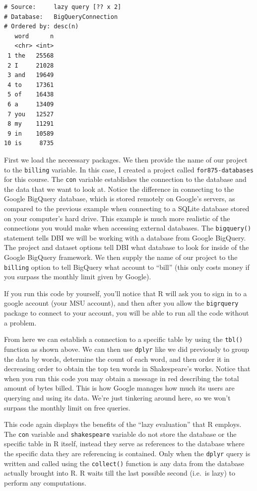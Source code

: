 \documentclass[
]{krantz}
\begin{document}
\begin{verbatim}
# Source:     lazy query [?? x 2]
# Database:   BigQueryConnection
# Ordered by: desc(n)
   word      n
   <chr> <int>
 1 the   25568
 2 I     21028
 3 and   19649
 4 to    17361
 5 of    16438
 6 a     13409
 7 you   12527
 8 my    11291
 9 in    10589
10 is     8735
\end{verbatim}

First we load the neceessary packages. We then provide the name of our project to the \texttt{billing} variable. In this case, I created a project called \texttt{for875-databases} for this course. The \texttt{con} variable establishes the connection to the database and the data that we want to look at. Notice the difference in connecting to the Google BigQuery database, which is stored remotely on Google's servers, as compared to the previous example when connecting to a SQLite database stored on your computer's hard drive. This example is much more realistic of the connections you would make when accessing external databases. The \texttt{bigquery()} statement tells DBI we will be working with a database from Google BigQuery. The project and dataset options tell DBI what database to look for inside of the Google BigQuery framework. We then supply the name of our project to the \texttt{billing} option to tell BigQuery what account to ``bill'' (this only costs money if you surpass the monthly limit given by Google).

If you run this code by yourself, you'll notice that R will ask you to sign in to a google account (your MSU account), and then after you allow the \texttt{bigrquery} package to connect to your account, you will be able to run all the code without a problem.

From here we can establish a connection to a specific table by using the \texttt{tbl()} function as shown above. We can then use \texttt{dplyr} like we did previously to group the data by words, determine the count of each word, and then order it in decreasing order to obtain the top ten words in Shakespeare's works. Notice that when you run this code you may obtain a message in red describing the total amount of bytes billed. This is how Google manages how much its users are querying and using its data. We're just tinkering around here, so we won't surpass the monthly limit on free queries.

This code again displays the benefits of the ``lazy evaluation'' that R employs. The \texttt{con} variable and \texttt{shakespeare} variable do not store the database or the specific table in R itself, instead they serve as references to the database where the specific data they are referencing is contained. Only when the \texttt{dplyr} query is written and called using the \texttt{collect()} function is any data from the database actually brought into R. R waits till the last possible second (i.e.~is lazy) to perform any computations.
\end{document}
